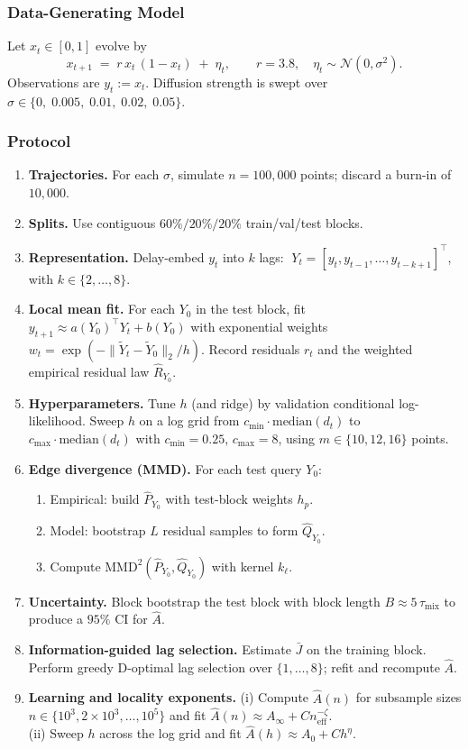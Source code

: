 \documentclass[11pt]{article}
\newcommand{\1}{\mathbf{1}}
\begin{document}
\subsubsection{Data-Generating Model}
Let $x_t \in [0,1]$ evolve by
\[
x_{t+1} \;=\; r\,x_t\,(1-x_t) \;+\; \eta_t, 
\qquad r = 3.8,\quad \eta_t \sim \mathcal{N}(0,\sigma^2).
\]
Observations are $y_t := x_t$. Diffusion strength is swept over $\sigma \in \{0,\;0.005,\;0.01,\;0.02,\;0.05\}$.

\subsubsection{Protocol}
\begin{enumerate}
  \item \textbf{Trajectories.} For each $\sigma$, simulate $n=100{,}000$ points; discard a burn-in of $10{,}000$.
  \item \textbf{Splits.} Use contiguous $60\%/20\%/20\%$ train/val/test blocks.
  \item \textbf{Representation.} Delay-embed $y_t$ into $k$ lags: 
  $\;Y_t = [y_t, y_{t-1},\dots,y_{t-k+1}]^\top$, 
  with $k \in \{2,\dots,8\}$.
  \item \textbf{Local mean fit.}  
  For each $Y_0$ in the test block, fit $y_{t+1} \approx a(Y_0)^\top Y_t + b(Y_0)$ with exponential weights 
  \(
    w_t = \exp(-\|\widetilde Y_t-\widetilde Y_0\|_2/h).
  \)
  Record residuals $r_t$ and the weighted empirical residual law $\widehat R_{Y_0}$.
  \item \textbf{Hyperparameters.} Tune $h$ (and ridge) by validation conditional log-likelihood. Sweep $h$ on a log grid from $c_{\min}\cdot\mathrm{median}(d_t)$ to $c_{\max}\cdot\mathrm{median}(d_t)$ with $c_{\min}=0.25$, $c_{\max}=8$, using $m\in\{10,12,16\}$ points.
  \item \textbf{Edge divergence (MMD).}  
  For each test query $Y_0$:
  \begin{enumerate}
    \item Empirical: build $\widehat P_{Y_0}$ with test-block weights $h_p$.
    \item Model: bootstrap $L$ residual samples to form $\widehat Q_{Y_0}$.
    \item Compute $\mathrm{MMD}^2(\widehat P_{Y_0},\widehat Q_{Y_0})$ with kernel $k_\ell$.
  \end{enumerate}
  \item \textbf{Uncertainty.} Block bootstrap the test block with block length $B \approx 5\,\tau_{\mathrm{mix}}$ to produce a $95\%$ CI for $\widehat{A}$.
  \item \textbf{Information-guided lag selection.}  
  Estimate $\bar J$ on the training block. Perform greedy D-optimal lag selection over $\{1,\dots,8\}$; refit and recompute $\widehat{A}$.
  \item \textbf{Learning and locality exponents.}  
  (i) Compute $\widehat{A}(n)$ for subsample sizes $n\in\{10^3,2\!\times\!10^3,\dots,10^5\}$ and fit $\widehat{A}(n)\approx A_\infty + Cn_{\mathrm{eff}}^{-\zeta}$. \\
  (ii) Sweep $h$ across the log grid and fit $\widehat{A}(h)\approx A_0 + C h^\eta$.
\end{enumerate}
\end{document}
